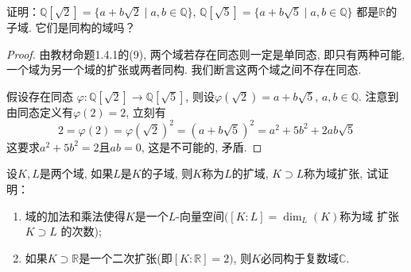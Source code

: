 \begin{problem}
    证明：$\mathbb{Q}[\sqrt 2] = \{a + b\sqrt 2 \mid a, b \in \mathbb{Q}\}$,
$\mathbb{Q}[\sqrt 5] = \{a + b\sqrt 5 \mid a, b \in \mathbb{Q}\}$
都是$\mathbb{R}$的子域. 它们是同构的域吗？
\end{problem}

\begin{proof}
    由教材命题1.4.1的(9), 两个域若存在同态则一定是单同态, 即只有两种可能, 
    一个域为另一个域的扩张或两者同构. 我们断言这两个域之间不存在同态.
    
    假设存在同态
$\varphi: \mathbb{Q}[\sqrt{2}] \to \mathbb{Q}[\sqrt{5}]$,
则设$\varphi(\sqrt{2}) = a + b\sqrt{5},\, a, b \in \mathbb{Q}$.
注意到由同态定义有$\varphi(2) = 2$, 立刻有
\[
    2 = \varphi(2) = \varphi(\sqrt{2})^2 = (a + b\sqrt{5})^2 = a^2 + 5b^2 + 2ab\sqrt{5}
\]
这要求$a^2 + 5b^2 = 2$且$ab = 0$, 这是不可能的, 矛盾.
\end{proof}

\begin{problem}\label{ex:1.4.9}
    设$K, L$是两个域, 如果$L$是$K$的子域, 则$K$称为$L$的扩域,
$K \supset L$称为域扩张, 试证明：
\begin{enumerate}[(1)]
    \item 域的加法和乘法使得$K$是一个$L$-向量空间$([K:L] = \dim_L(K)$称为域
扩张$K \supset L$ 的次数);
    \item 如果$K \supset \mathbb{R}$是一个二次扩张(即$[K:\mathbb{R}] = 2)$,
则$K$必同构于复数域$\mathbb{C}$.
\end{enumerate}
\end{problem}

